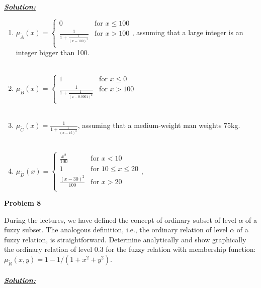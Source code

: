 \documentclass{article}
\begin{document}
\noindent \underline{\textbf{\textit{Solution:}}}\\
\begin{enumerate} [label = \Alph*]
  \item $\mu_{\utilde{A}}(x) = \begin{cases}
    0 &\text{for } x \leq 100 \\
    \frac{1}{1+\frac{1}{(x-100)^2}} &\text{for } x>100\\
    
  \end{cases}$, assuming that a large integer is an integer bigger than 100.\\\\
  \item $\mu_{\utilde{B}}(x) = \begin{cases}
    1 &\text{for } x \leq 0 \\
    \frac{1}{1+\frac{1}{(x-0.0001)^2}} &\text{for } x>100\\
  \end{cases}$ \\ \\
  \item $\mu_{\utilde{C}}(x) = 
    \frac{1}{1+\frac{1}{(x-75)^2}}$, assuming that a medium-weight man weights 75kg.\\\\
  \item $\mu_{\utilde{D}}(x) = \begin{cases}
    \frac{x^2}{100} & \text{for } x<10 \\
    1 &\text{for } 10 \leq x \leq 20 \\
    \frac{(x-30)^2}{100} &\text{for } x>20\\
    
  \end{cases}$,
\end{enumerate}


\newpage
\noindent \textbf{Problem 8}

\noindent During the lectures, we have defined the concept of ordinary subset of level $\alpha$ of a fuzzy 
subset. The analogous definition, i.e., the ordinary relation of level $\alpha$ of a fuzzy relation, is 
straightforward. Determine analytically and show graphically the ordinary relation of level 
0.3 for the fuzzy relation with membership function: $\mu_{\utilde{R}}(x, y) = 1 - 1/(1+x^2+y^2)$.
\\ \\
\noindent \underline{\textbf{\textit{Solution:}}}
\end{document}
